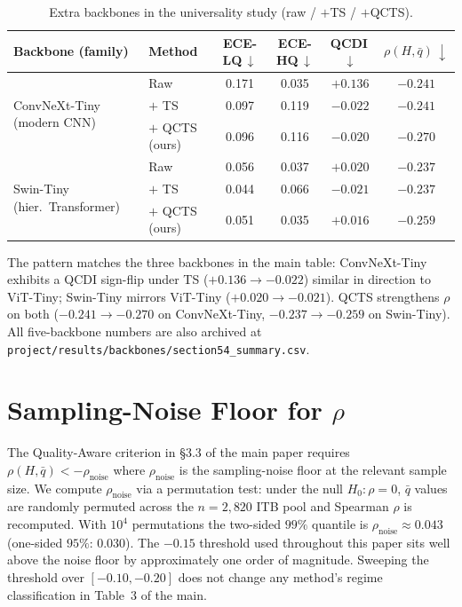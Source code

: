 \documentclass{bmvc2k}
\begin{document}
\begin{table}[h]
\centering
\caption{Extra backbones in the universality study (raw / $+$TS / $+$QCTS).}
\label{tab:extra_backbones}
\footnotesize
\begin{tabular}{llcccc}
\toprule
Backbone (family) & Method & ECE-LQ\,$\downarrow$ & ECE-HQ\,$\downarrow$ & QCDI\,$\downarrow$ & $\rho(H,\bar q)\,\downarrow$ \\
\midrule
\multirow{3}{*}{ConvNeXt-Tiny (modern CNN)}
  & Raw             & 0.171 & 0.035 & $+0.136$ & $-0.241$ \\
  & $+$ TS          & 0.097 & 0.119 & $-0.022$ & $-0.241$ \\
  & $+$ QCTS (ours) & 0.096 & 0.116 & $-0.020$ & $\mathbf{-0.270}$ \\
\midrule
\multirow{3}{*}{Swin-Tiny (hier.\ Transformer)}
  & Raw             & 0.056 & 0.037 & $+0.020$ & $-0.237$ \\
  & $+$ TS          & 0.044 & 0.066 & $-0.021$ & $-0.237$ \\
  & $+$ QCTS (ours) & 0.051 & 0.035 & $+0.016$ & $\mathbf{-0.259}$ \\
\bottomrule
\end{tabular}
\end{table}

The pattern matches the three backbones in the main table: ConvNeXt-Tiny exhibits a QCDI sign-flip under TS ($+0.136\to-0.022$) similar in direction to ViT-Tiny; Swin-Tiny mirrors ViT-Tiny ($+0.020\to-0.021$). QCTS strengthens $\rho$ on both ($-0.241\to-0.270$ on ConvNeXt-Tiny, $-0.237\to-0.259$ on Swin-Tiny). All five-backbone numbers are also archived at \texttt{project/results/backbones/section54\_summary.csv}.

\section{Sampling-Noise Floor for $\rho$}
\label{app:rho_noise}

The Quality-Aware criterion in \S3.3 of the main paper requires $\rho(H,\bar q) < -\rho_\text{noise}$ where $\rho_\text{noise}$ is the sampling-noise floor at the relevant sample size. We compute $\rho_\text{noise}$ via a permutation test: under the null $H_0: \rho{=}0$, $\bar q$ values are randomly permuted across the $n{=}2{,}820$ ITB pool and Spearman $\rho$ is recomputed. With $10^4$ permutations the two-sided $99\%$ quantile is $\rho_\text{noise}{\approx}0.043$ (one-sided $95\%$: $0.030$). The $-0.15$ threshold used throughout this paper sits well above the noise floor by approximately one order of magnitude. Sweeping the threshold over $[-0.10, -0.20]$ does not change any method's regime classification in Table~3 of the main.
\end{document}
